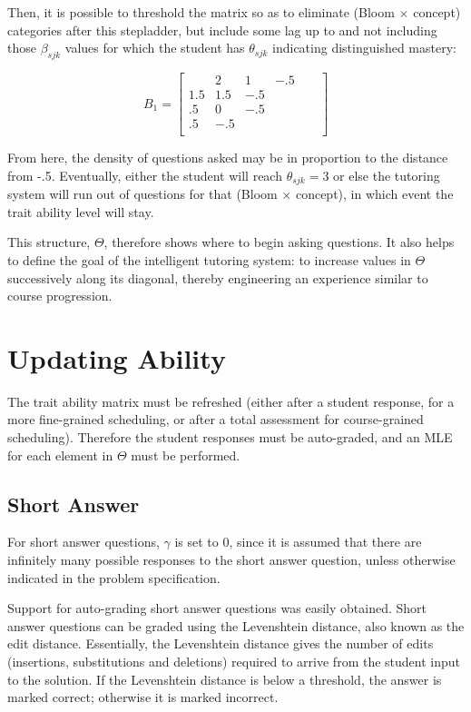 Then, it is possible to threshold the matrix so as to eliminate (Bloom $\times$
concept) categories after this stepladder, but include some lag up to and not
including those $\beta_{sjk}$ values for which the student has $\theta_{sjk}$
indicating distinguished mastery:

\begin{equation}
B_1 =\left[
         \begin{array}{llllll}
                 & 2    & 1   & -.5  &        &      \\
             1.5 & 1.5  & -.5 &      &        &      \\
             .5  &  0   & -.5 &      &        &      \\
             .5  & -.5  &     &      &        &      \\
         \end{array}
       \right]
\end{equation}
\vspace{12pt}

From here, the density of questions asked may be in proportion to the distance
from -.5.  Eventually, either the student will reach $\theta_{sjk} = 3$ or else
the tutoring system will run out of questions for that (Bloom $\times$
concept), in which event the trait ability level will stay.

This structure, $\Theta$, therefore shows where to begin asking questions.  It
also helps to define the goal of the intelligent tutoring system: to increase
values in $\Theta$ successively along its diagonal, thereby engineering an
experience similar to course progression.

\section{Updating Ability}

The trait ability matrix must be refreshed (either after a student response,
for a more fine-grained scheduling, or after a total assessment for
course-grained scheduling).  Therefore the student responses must be
auto-graded, and an MLE for each element in $\Theta$ must be performed.

\subsection{Short Answer}

For short answer questions, $\gamma$ is set to 0, since it is assumed that
there are infinitely many possible responses to the short answer question,
unless otherwise indicated in the problem specification. 

Support for auto-grading short answer questions was easily obtained.  Short
answer questions can be graded using the Levenshtein distance, also known as
the edit distance.  Essentially, the Levenshtein distance gives the number of
edits (insertions, substitutions and deletions) required to arrive from the
student input to the solution.  If the Levenshtein distance is below a
threshold, the answer is marked correct; otherwise it is marked incorrect. 

